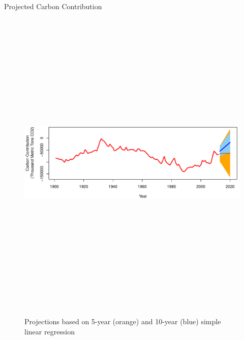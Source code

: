\documentclass[final]{beamer}\usepackage[]{graphicx}\usepackage[]{color}
\newlength{\onecolwid}
\newlength{\twocolwid}
\begin{document}
\begin{frame}[t]
\begin{columns}[t]
\begin{column}{\twocolwid}
\begin{columns}[t,totalwidth=\twocolwid]
\begin{column}{\onecolwid}
\begin{block}{Projected Carbon Contribution}
\vspace{-2cm}
\begin{figure}
    {\includegraphics[width=1\linewidth, height=15cm]{ProjectionPlot.pdf}}
    \caption{Projections based on 5-year (orange) and 10-year (blue) simple linear regression}
\end{figure}
\end{block}


\end{column} %

\end{columns} %



\end{column}
\end{columns}
\end{frame}
\end{document}
